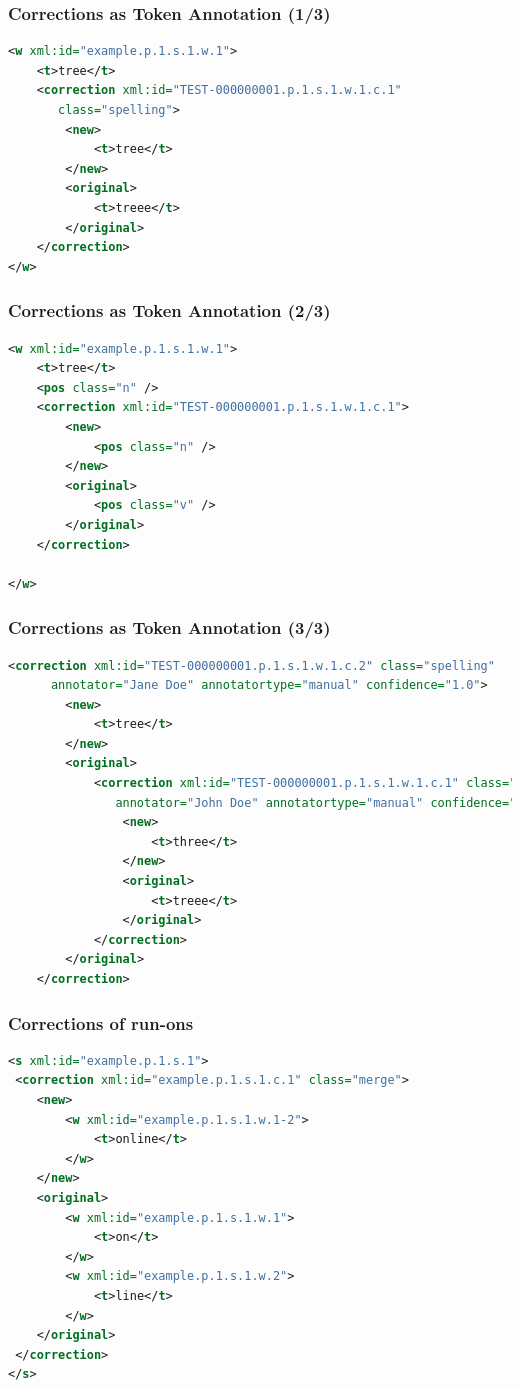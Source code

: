 \documentclass[compress]{beamer}
\begin{document}
        
\begin{frame}[fragile]
\frametitle{Corrections as Token Annotation (1/3)}

\begin{lstlisting}[language=xml]
<w xml:id="example.p.1.s.1.w.1">
    <t>tree</t>
    <correction xml:id="TEST-000000001.p.1.s.1.w.1.c.1"
       class="spelling">
        <new>
            <t>tree</t>
        </new>
        <original>
            <t>treee</t>
        </original>
    </correction>
</w>
\end{lstlisting}                 

\end{frame}


\begin{frame}[fragile]
\frametitle{Corrections as Token Annotation (2/3)}

\begin{lstlisting}[language=xml]
<w xml:id="example.p.1.s.1.w.1">
    <t>tree</t>
    <pos class="n" />
    <correction xml:id="TEST-000000001.p.1.s.1.w.1.c.1">
        <new>
            <pos class="n" />
        </new>
        <original>
            <pos class="v" />
        </original>
    </correction>
    
</w>    
\end{lstlisting}

\end{frame}

\begin{frame}[fragile]
\frametitle{Corrections as Token Annotation (3/3)}

\begin{lstlisting}[language=xml]
    <correction xml:id="TEST-000000001.p.1.s.1.w.1.c.2" class="spelling" 
      annotator="Jane Doe" annotatortype="manual" confidence="1.0">
        <new>
            <t>tree</t>
        </new>
        <original>
            <correction xml:id="TEST-000000001.p.1.s.1.w.1.c.1" class="spelling"
               annotator="John Doe" annotatortype="manual" confidence="0.6">
                <new>
                    <t>three</t>
                </new>
                <original>
                    <t>treee</t>
                </original>
            </correction>
        </original>
    </correction>
\end{lstlisting}

\end{frame}

\begin{frame}[fragile]
\frametitle{Corrections of run-ons}

\begin{lstlisting}[language=xml]
<s xml:id="example.p.1.s.1">
 <correction xml:id="example.p.1.s.1.c.1" class="merge">
    <new>
        <w xml:id="example.p.1.s.1.w.1-2">    
            <t>online</t>
        </w>
    </new>
    <original>
        <w xml:id="example.p.1.s.1.w.1">
            <t>on</t>
        </w>
        <w xml:id="example.p.1.s.1.w.2">
            <t>line</t>
        </w>                         
    </original>
 </correction>               
</s>
\end{lstlisting} 

\end{frame}
\end{document}
